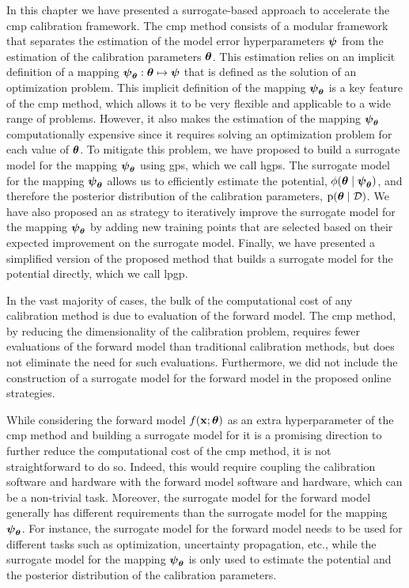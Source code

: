 In this chapter we have presented a surrogate-based approach to accelerate the \gls{cmp} calibration framework. The \gls{cmp} method consists of a modular framework that separates the estimation of the model error hyperparameters $\boldsymbol{\psi}$ from the estimation of the calibration parameters $\boldsymbol{\theta}$. This estimation relies on an implicit definition of a mapping $\boldsymbol{\psi}_{\boldsymbol{\theta}} : \boldsymbol{\theta} \mapsto \boldsymbol{\psi}$ that is defined as the solution of an optimization problem. This implicit definition of the mapping $\boldsymbol{\psi}_{\boldsymbol{\theta}}$ is a key feature of the \gls{cmp} method, which allows it to be very flexible and applicable to a wide range of problems. However, it also makes the estimation of the mapping $\boldsymbol{\psi}_{\boldsymbol{\theta}}$ computationally expensive since it requires solving an optimization problem for each value of $\boldsymbol{\theta}$. To mitigate this problem, we have proposed to build a surrogate model for the mapping $\boldsymbol{\psi}_{\boldsymbol{\theta}}$ using \glspl{gp}, which we call \glspl{hgp}. The surrogate model for the mapping $\boldsymbol{\psi}_{\boldsymbol{\theta}}$ allows us to efficiently estimate the potential, $\phi(\boldsymbol{\theta} \mid \boldsymbol{\psi}_{\boldsymbol{\theta}})$, and therefore the posterior distribution of the calibration parameters, $\mathrm{p}(\boldsymbol{\theta} \mid \mathcal{D})$. We have also proposed an \gls{as} strategy to iteratively improve the surrogate model for the mapping $\boldsymbol{\psi}_{\boldsymbol{\theta}}$ by adding new training points that are selected based on their expected improvement on the surrogate model. Finally, we have presented a simplified version of the proposed method that builds a surrogate model for the potential directly, which we call \gls{lpgp}.

\smallskip
In the vast majority of cases, the bulk of the computational cost of any calibration method is due to evaluation of the forward model. The \gls{cmp} method, by reducing the dimensionality of the calibration problem, requires fewer evaluations of the forward model than traditional calibration methods, but does not eliminate the need for such evaluations. Furthermore, we did not include the construction of a surrogate model for the forward model in the proposed online strategies.

\smallskip
While considering the forward model $f(\mathbf{x};\boldsymbol{\theta})$ as an extra hyperparameter of the \gls{cmp} method and building a surrogate model for it is a promising direction to further reduce the computational cost of the \gls{cmp} method, it is not straightforward to do so. Indeed, this would require coupling the calibration software and hardware with the forward model software and hardware, which can be a non-trivial task. Moreover, the surrogate model for the forward model generally has different requirements than the surrogate model for the mapping $\boldsymbol{\psi}_{\boldsymbol{\theta}}$. For instance, the surrogate model for the forward model needs to be used for different tasks such as optimization, uncertainty propagation, etc., while the surrogate model for the mapping $\boldsymbol{\psi}_{\boldsymbol{\theta}}$ is only used to estimate the potential and the posterior distribution of the calibration parameters. 


